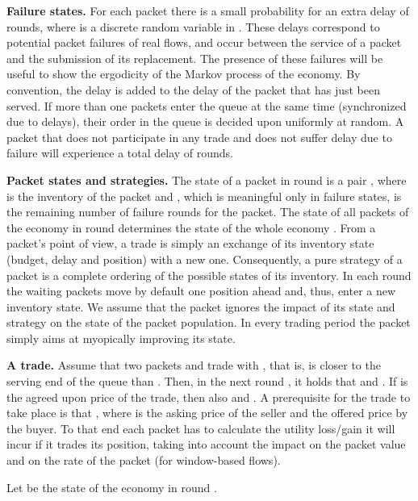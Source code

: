 \documentclass[letterpaper,10pt]{llncs}
\begin{document}
\textbf{Failure states.}
For each packet there is a small probability  for an extra delay of  rounds, where  is a discrete random variable in .
These delays correspond to potential packet failures of real flows, and occur
between the service of a packet and the submission of its replacement.
The presence 
of these failures will be useful to show the ergodicity of the Markov process of the economy.
By convention, the delay  is added to the delay of the packet that has just been served. If more than one packets enter the queue at the same time (synchronized due to delays), 
their order in the queue is decided upon uniformly at random. 
A packet that does not participate in any trade and does not suffer delay due to failure will
experience a total delay of  rounds.

{\bf Packet states and strategies.}
The state  of a packet  in round  is a pair
, where  is the inventory of the packet and , which is meaningful only in failure states, is the remaining number of failure rounds for the packet.
The state of all packets of the economy in round  determines the state of the whole economy .
From a packet's point of view, a trade is simply an exchange of its inventory state (budget, delay and position)
with a new one. Consequently, a pure strategy of a packet is a complete ordering of the possible states
of its inventory. 
In each round the waiting packets move by default one position ahead and, thus, enter 
a new inventory state. 
We assume that the packet ignores the impact of its state and strategy on the state of the packet population.
In every trading period the packet simply aims at myopically improving its state.


{\bf A trade.}
Assume that two packets  and  trade with , that is,  is closer to the serving end of the queue than . Then, in the next round , it holds that  and . If  is the agreed upon price of the trade, then also  and . A prerequisite for the trade to take place is that , where
 is the asking price of the seller and  the offered price by the buyer.
To that end each packet has to calculate the utility loss/gain it will incur if it trades its position,
taking into account the impact on the packet value  and on the rate of the packet (for window-based flows).

\begin{definition}
Let  be the state of the economy in round .
\end{definition}
\end{document}
